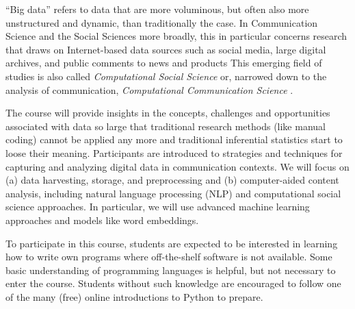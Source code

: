 
``Big data'' refers to data that are more voluminous, but often also more unstructured and dynamic, than traditionally the case. In Communication Science and the Social Sciences more broadly, this in particular concerns research that draws on Internet-based data sources such as social media, large digital archives, and public comments to news and products This emerging field of studies is also called \emph{Computational Social Science} \citep{Lazer2009} or, narrowed down to the analysis of communication, \emph{Computational Communication Science} \citep{Shah2015}.

The course will provide insights in the concepts, challenges and opportunities associated with data so large that traditional research methods (like manual coding) cannot be applied any more and traditional inferential statistics start to loose their meaning. Participants are introduced to strategies and techniques for capturing and analyzing digital data in communication contexts. We will focus on (a) data harvesting, storage, and preprocessing and (b) computer-aided content analysis, including natural language processing (NLP) and computational social science approaches. In particular, we will use advanced machine learning approaches and models like word embeddings.

To participate in this course, students are expected to be interested in learning how to write own programs where off-the-shelf software is not available. Some basic understanding of programming languages is helpful, but not necessary to enter the course. Students without such knowledge are encouraged to follow one of the many (free) online introductions to Python to prepare.

